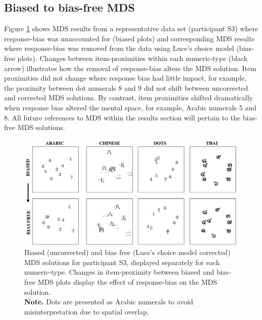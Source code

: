 \subsection{Biased to bias-free MDS}
Figure \ref{fig:Bias2Biasfree} shows MDS results from a representative data set (participant S3) where response-bias was unaccounted for (biased plots) and corresponding MDS results where response-bias was removed from the data using Luce's choice model (bias-free plots). Changes between item-proximities within each numeric-type (black arrow) illustrates how the removal of response-bias alters the MDS solution. Item proximities did not change where response bias had little impact, for example, the proximity between dot numerals 8 and 9 did not shift between uncorrected and corrected MDS solutions. By contrast, item proximities shifted dramatically when response bias altered the mental space, for example, Arabic numerals 5 and 8. All future references to MDS within the results section will pertain to the bias-free MDS solutions.

\begin{figure}[tbh]
\centering \includegraphics[width = \linewidth]{Figures/CrossWheel/Bias2BiasFree.pdf}
\caption{Biased (uncorrected) and bias free (Luce's choice model corrected) MDS solutions for participant S3, displayed separately for each numeric-type. Changes in item-proximity between biased and bias-free MDS plots display the effect of response-bias on the MDS solution. \\\textbf{Note.} Dots are presented as Arabic numerals to avoid misinterpretation due to spatial overlap.}
\label{fig:Bias2Biasfree}
\end{figure}

